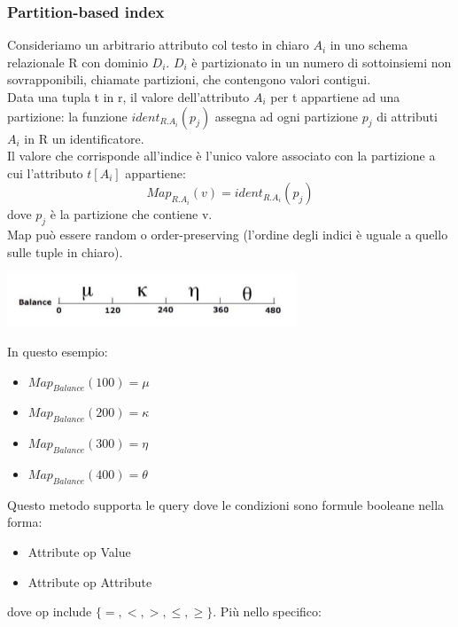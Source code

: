 \subsubsection{Partition-based index}
Consideriamo un arbitrario attributo col testo in chiaro \(A_i\) in uno schema relazionale R con dominio \(D_i\). \(D_i\) è partizionato in un numero di sottoinsiemi non sovrapponibili, chiamate partizioni, che contengono valori contigui. \\
Data una tupla t in r, il valore dell'attributo \(A_i\) per t appartiene ad una partizione: la funzione \(ident_{R.A_i}(p_j)\) assegna ad ogni partizione \(p_j\) di attributi \(A_i\) in R un identificatore.\\
Il valore che corrisponde all'indice è l'unico valore associato con la partizione a cui l'attributo \(t[A_i]\) appartiene: \[Map_{R.A_i}(v) = ident_{R.A_i}(p_j)\]
dove \(p_j\) è la partizione che contiene v.\\
Map può essere random o order-preserving (l'ordine degli indici è uguale a quello sulle tuple in chiaro).
\begin{center}
    \includegraphics[scale=0.7]{img/partbased.png}
\end{center}
In questo esempio:
\begin{itemize}
    \item \(Map_{Balance}(100) = \mu \)
    \item \(Map_{Balance}(200) = \kappa \)
    \item \(Map_{Balance}(300) = \eta \)
    \item \(Map_{Balance}(400) = \theta \)
\end{itemize}
Questo metodo supporta le query dove le condizioni sono formule booleane nella forma: 
\begin{itemize}
    \item Attribute op Value
    \item Attribute op Attribute
\end{itemize}
dove op include \(\{=, <, >, \leq, \geq\}\). Più nello specifico:
